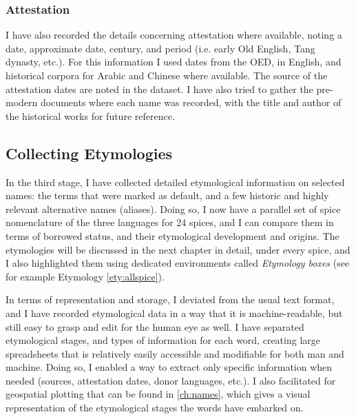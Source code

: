 
\subsubsection{Attestation}

I have also recorded the details concerning attestation where available, noting a date, approximate date, century, and period (i.e. early Old English, Tang dynasty, etc.). For this information I used dates from the \gls{OED}, in English, and historical corpora for Arabic and Chinese where available. The source of the attestation dates are noted in the dataset. I have also tried to gather the pre-modern documents where each name was recorded, with the title and author of the historical works for future reference. %



\subsection{Collecting Etymologies}
\label{sec:collecting_etymologies}

In the third stage, I have collected detailed etymological information on selected names: the terms that were marked as default, and a few historic and highly relevant alternative names (aliases). Doing so, I now have a parallel set of spice nomenclature of the three languages for 24 spices, and I can compare them in terms of borrowed status, and their etymological development and origins. The etymologies will be discussed in the next chapter in detail, under every spice, and I also highlighted them using dedicated environments called \textit{Etymology boxes} (see for example Etymology \ref{ety:allspice}).

In terms of representation and storage, I deviated from the usual text format, and I have recorded etymological data in a way that it is machine-readable, but still easy to grasp and edit for the human eye as well. I have separated etymological stages, and types of information for each word, creating large spreadsheets that is relatively easily accessible and modifiable for both man and machine. Doing so, I enabled a way to extract only specific information when needed (sources, attestation dates, donor languages, etc.). I also facilitated for geospatial plotting that can be found in \cref{ch:names}, which gives a visual representation of the etymological stages the words have embarked on.

